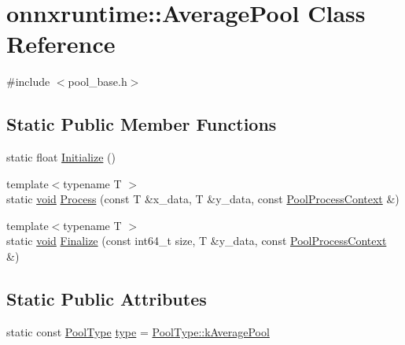 \hypertarget{classonnxruntime_1_1AveragePool}{}\section{onnxruntime\+:\+:Average\+Pool Class Reference}
\label{classonnxruntime_1_1AveragePool}


{\ttfamily \#include $<$pool\+\_\+base.\+h$>$}

\subsection*{Static Public Member Functions}
\begin{DoxyCompactItemize}
\item 
static float \mbox{\hyperlink{classonnxruntime_1_1AveragePool_aa9b9e114567851c45c2b4c61edb08f99}{Initialize}} ()
\item 
{\footnotesize template$<$typename T $>$ }\\static \mbox{\hyperlink{mlasi_8h_a88f941d423cb2a819b70a1358982b1a6}{void}} \mbox{\hyperlink{classonnxruntime_1_1AveragePool_a3c9ac26608524a9cb59485d946f02cdf}{Process}} (const T \&x\+\_\+data, T \&y\+\_\+data, const \mbox{\hyperlink{classonnxruntime_1_1PoolProcessContext}{Pool\+Process\+Context}} \&)
\item 
{\footnotesize template$<$typename T $>$ }\\static \mbox{\hyperlink{mlasi_8h_a88f941d423cb2a819b70a1358982b1a6}{void}} \mbox{\hyperlink{classonnxruntime_1_1AveragePool_ae89947ca117914131283a851f025b932}{Finalize}} (const int64\+\_\+t size, T \&y\+\_\+data, const \mbox{\hyperlink{classonnxruntime_1_1PoolProcessContext}{Pool\+Process\+Context}} \&)
\end{DoxyCompactItemize}
\subsection*{Static Public Attributes}
\begin{DoxyCompactItemize}
\item 
static const \mbox{\hyperlink{namespaceonnxruntime_aa4ff52f19ea8c4d3e4ce3ffbabbc7060}{Pool\+Type}} \mbox{\hyperlink{classonnxruntime_1_1AveragePool_a48aefe1c9e248a55a958e87f06588089}{type}} = \mbox{\hyperlink{namespaceonnxruntime_aa4ff52f19ea8c4d3e4ce3ffbabbc7060a38dcd3a65185af31f965caa845edfb0f}{Pool\+Type\+::k\+Average\+Pool}}
\end{DoxyCompactItemize}


